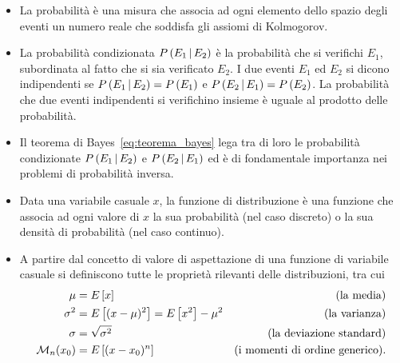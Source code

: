 \begin{itemize}
\item La probabilità è una misura che associa ad ogni elemento dello spazio
  degli eventi un numero reale che soddisfa gli assiomi di Kolmogorov.
\item La probabilità condizionata $\displaystyle P\left(E_1 \,|\, E_2\right)$ è la probabilità
  che si verifichi $E_1$, subordinata al fatto che si sia verificato $E_2$.
  I due eventi $E_1$ ed $E_2$ si dicono indipendenti se
  $\displaystyle P\left(E_1 \,|\, E_2\right) = \displaystyle P\left(E_1\right)$ e $\displaystyle P\left(E_2 \,|\, E_1\right) = \displaystyle P\left(E_2\right)$.
  La probabilità che due eventi indipendenti si verifichino insieme è
  uguale al prodotto delle probabilità.
\item Il teorema di Bayes~\eqref{eq:teorema_bayes} lega tra di loro le
  probabilità condizionate $\displaystyle P\left(E_1 \,|\, E_2\right)$ e $\displaystyle P\left(E_2 \,|\, E_1\right)$ ed
  è di fondamentale importanza nei problemi di probabilità inversa.
\item Data una variabile casuale $x$, la funzione di distribuzione è una
  funzione che associa ad ogni valore di $x$ la sua probabilità (nel caso
  discreto) o la sua densità di probabilità (nel caso continuo).
\item A partire dal concetto di valore di aspettazione di una funzione di
  variabile casuale si definiscono tutte le proprietà rilevanti delle
  distribuzioni, tra cui
  \begin{align*}
    \mu & = \expect{x} & \text{(la media)}\\
    \sigma^2 & = \expect{(x - \mu)^2} = \expect{x^2} - \mu^2 &
    \text{(la varianza)}\\
    \sigma & = \sqrt{\sigma^2} & \text{(la deviazione standard)}\\
    \mom[x_0]{n} & = \expect{(x - x_0)^n} &
    \text{(i momenti di ordine generico)}.
  \end{align*}
\end{itemize}
